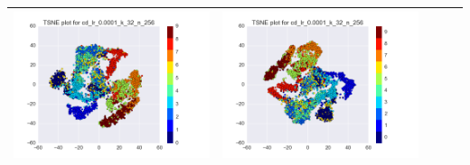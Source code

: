 \documentclass[12pt]{report}
\begin{document}
\begin{table}[H]
\begin{tabular}{ | c | c | c | c || c |}
\begin{minipage}{.3\textwidth}
      \includegraphics[scale=0.25]{cd_lr_0_0001_k_32_n_256.png}
    \end{minipage} &
    \begin{minipage}{.3\textwidth}
      \includegraphics[scale=0.25]{test_cd_lr_0_0001_k_32_n_256.png}
    \end{minipage}
   \\ \hline
  \end{tabular}
\end{table}
\end{document}
